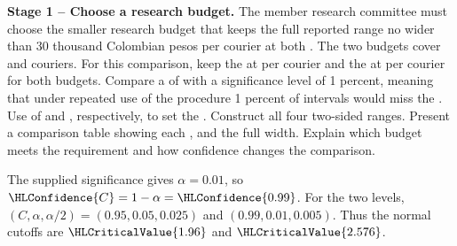 \textbf{Stage 1 -- Choose a research budget.} The member research committee must choose the smaller research budget that keeps the full reported range no wider than 30 thousand Colombian pesos per courier at both . The two budgets cover  and  couriers. For this comparison, keep the   at   per courier and the   at   per courier for both budgets. Compare a  of  with a significance level of 1 percent, meaning that under repeated use of the procedure 1 percent of intervals would miss the . Use  of  and , respectively, to set the   . Construct all four two-sided ranges. Present a comparison table showing each ,  and the full width. Explain which budget meets the requirement and how confidence changes the comparison.
\par\endgroup

\begingroup
\setlength{\abovedisplayskip}{6pt}
\setlength{\belowdisplayskip}{6pt}
\setlength{\abovedisplayshortskip}{3pt}
\setlength{\belowdisplayshortskip}{4pt}
\setlength{\parskip}{4pt}

The supplied significance gives $\alpha=0.01$, so $\HLConfidence{C}=1-\alpha=\HLConfidence{0.99}$. For the two levels, $(C,\alpha,\alpha/2)=(0.95,0.05,0.025)$ and $(0.99,0.01,0.005)$. Thus the normal cutoffs are $\HLCriticalValue{1.96}$ and $\HLCriticalValue{2.576}$.

